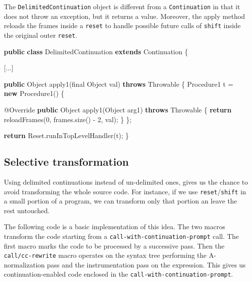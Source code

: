 \documentclass[12pt,a4paper,oneside,openright]{book}
\newenvironment{Shaded}{\begin{snugshade}}{\end{snugshade}}
\newcommand{\KeywordTok}[1]{\textcolor[rgb]{0.13,0.29,0.53}{\textbf{{#1}}}}
\newcommand{\DataTypeTok}[1]{\textcolor[rgb]{0.13,0.29,0.53}{{#1}}}
\newcommand{\DecValTok}[1]{\textcolor[rgb]{0.00,0.00,0.81}{{#1}}}
\newcommand{\FunctionTok}[1]{\textcolor[rgb]{0.00,0.00,0.00}{{#1}}}
\newcommand{\NormalTok}[1]{{#1}}
\begin{document}
The \texttt{DelimitedContinuation} object is different from a
\texttt{Continuation} in that it does not throw an exception, but it
returns a value. Moreover, the apply method reloads the frames inside a
\texttt{reset} to handle possible future calls of \texttt{shift} inside
the original outer \texttt{reset}.

\begin{Shaded}
\begin{Highlighting}[]
\KeywordTok{public} \KeywordTok{class} \NormalTok{DelimitedContinuation }\KeywordTok{extends} \NormalTok{Continuation \{}

    \NormalTok{[...]}

    \KeywordTok{public} \NormalTok{Object }\FunctionTok{apply1}\NormalTok{(}\DataTypeTok{final} \NormalTok{Object val) }\KeywordTok{throws} \NormalTok{Throwable \{}
        \NormalTok{Procedure1 t = }\KeywordTok{new} \FunctionTok{Procedure1}\NormalTok{() \{}

            \FunctionTok{@Override}
            \KeywordTok{public} \NormalTok{Object }\FunctionTok{apply1}\NormalTok{(Object arg1) }\KeywordTok{throws} \NormalTok{Throwable \{}
                \KeywordTok{return} \FunctionTok{reloadFrames}\NormalTok{(}\DecValTok{0}\NormalTok{, frames.}\FunctionTok{size}\NormalTok{() - }\DecValTok{2}\NormalTok{, val);}
            \NormalTok{\}}
        \NormalTok{\};}

        \KeywordTok{return} \NormalTok{Reset.}\FunctionTok{runInTopLevelHandler}\NormalTok{(t);}
    \NormalTok{\}}
\end{Highlighting}
\end{Shaded}

\subsection{Selective transformation}\label{selective-transformation}

Using delimited continuations instead of un-delimited ones, gives us the
chance to avoid transforming the whole source code. For instance, if we
use \texttt{reset}/\texttt{shift} in a small portion of a program, we
can transform only that portion an leave the rest untouched.

The following code is a basic implementation of this idea. The two
macros transform the code starting from a
\texttt{call-with-continuation-prompt} call. The first macro marks the
code to be processed by a successive pass. Then the
\texttt{call/cc-rewrite} macro operates on the syntax tree performing
the A-normalization pass and the instrumentation pass on the expression.
This gives us continuation-enabled code enclosed in the
\texttt{call-with-continuation-prompt}.
\end{document}
